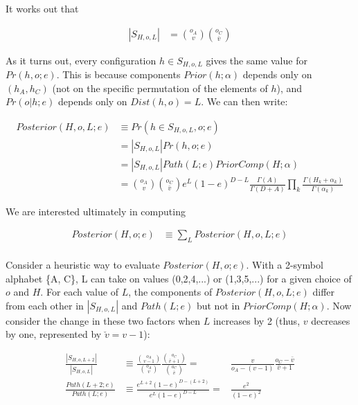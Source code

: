\documentclass{article}
\begin{document}
It works out that

\begin{align}
  |S_{H,o,L}| & = {o_A \choose v} {o_C \choose \bar{v}}
\end{align}

As it turns out, every configuration $h \in S_{H,o,L}$ gives the same
value for $Pr(h, o; e)$.  This is because components $Prior(h;\alpha)$
depends only on $(h_A,h_C)$ (not on the specific permutation of the
elements of $h$), and $Pr(o|h;e)$ depends only on $Dist(h,o) = L$. We
can then write:

\begin{align}
  Posterior(H,o,L;e) & \equiv Pr(h \in S_{H,o,L},o;e) \nonumber \\[2ex]
  & = |S_{H,o,L}| Pr(h,o;e) \nonumber \\[2ex]
  & = |S_{H,o,L}| Path(L;e) PriorComp(H;\alpha) \nonumber \\[2ex]
  & = {o_A \choose v}{o_C \choose \bar{v}}
  e^L(1-e)^{D-L}
  \frac{\Gamma(A)}{\Gamma(D+A)}
  \prod_k \frac{\Gamma(H_k+\alpha_k)}{\Gamma(\alpha_k)}
\end{align}


We are interested ultimately in computing

\begin{align}
  Posterior(H,o;e) & \equiv \sum_L Posterior(H,o,L;e) \nonumber \\
\end{align}




Consider a heuristic way to evaluate $Posterior(H,o;e)$. With a
2-symbol alphabet \{A, C\}, L can take on values (0,2,4,...) or
(1,3,5,...) for a given choice of $o$ and $H$. For each value of $L$,
the components of $Posterior(H,o,L;e)$ differ from each other in
$|S_{H,o,L}|$ and $Path(L;e)$ but not in $PriorComp(H;\alpha)$.  Now
consider the change in these two factors when $L$ increases by 2
(thus, $v$ decreases by one, represented by $\check{v} = v - 1$):

\begin{align}
  \frac{|S_{H,o,L+2}|}{|S_{H,o,L}|}
  & \equiv
  \frac{{o_A \choose {v-1}}}{{o_A \choose v}}
  \frac{{o_C \choose {\bar{v}+1}}}{{o_C \choose {\bar{v}}}}
  = &
  \frac{v}{o_A-(v-1)}
  \frac{o_C - \bar{v}}{\bar{v} + 1} \\[4ex]
  \frac{Path(L+2;e)}{Path(L;e)}
  & \equiv
  \frac{e^{L+2}(1-e)^{D-(L+2)}}{e^L(1-e)^{D-L}}
  = &
  \frac{e^2}{(1-e)^2}
\end{align}
\end{document}
